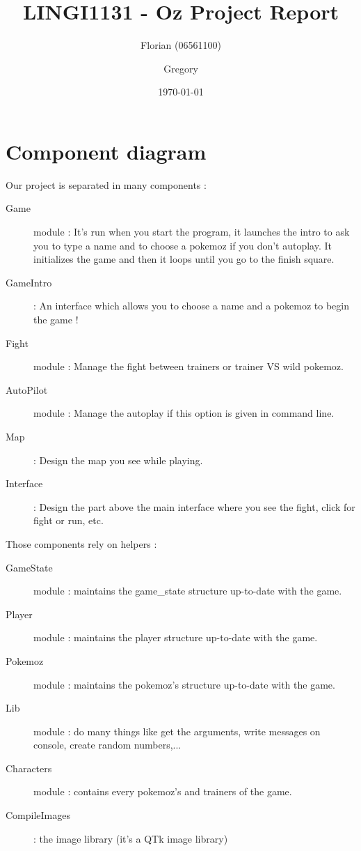 \documentclass[12pt, a4paper]{article}
\author{Florian \bsc{Thuin} (06561100) \and Gregory \bsc{Vander Schueren}}
\title{LINGI1131 - Oz Project Report}
\date{\today}
\begin{document}
\maketitle
\section{Component diagram}

Our project is separated in many \og{}components\fg{} :

\begin{description}
 \item[Game] module : It's run when you start the program, it launches the intro to ask you to type a name and to choose a pokemoz if you don't autoplay. It initializes the game and then it loops until you go to the finish square.
 
 \item[GameIntro] : An interface which allows you to choose a name and a pokemoz to begin the game !
 \item[Fight] module : Manage the fight between trainers or trainer VS wild pokemoz.
 \item[AutoPilot] module : Manage the autoplay if this option is given in command line.
 \item[Map] : Design the map you see while playing.
 \item[Interface] : Design the part above the main interface where you see the fight, click for fight or run, etc.

\end{description}

\bigskip

Those components rely on \og{}helpers\fg{} :

\begin{description}
 \item[GameState] module : maintains the game\_state structure up-to-date with the game.
 \item[Player] module : maintains the player structure up-to-date with the game.
 \item[Pokemoz] module : maintains the pokemoz's structure up-to-date with the game.
 \item[Lib] module : do many things like get the arguments, write messages on console, create random numbers,...
 \item[Characters] module : contains every pokemoz's and trainers of the game.
 \item[CompileImages] : the image library (it's a QTk image library)
 
\end{description}
\end{document}
